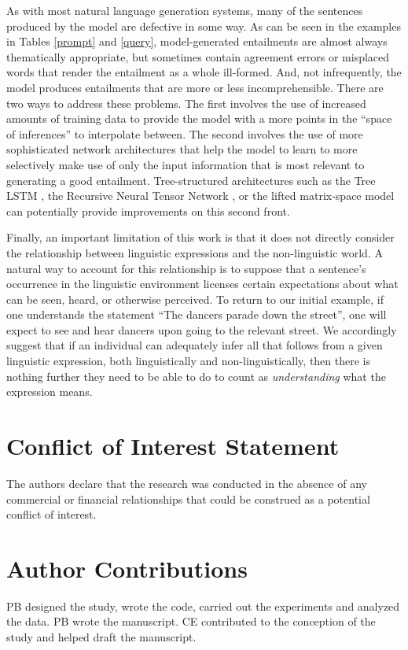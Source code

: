 \documentclass[utf8]{frontiersSCNS} %
\begin{document}
As with most natural language generation systems, many of the sentences produced by the model are defective in some way. As can be seen in the examples in Tables \ref{prompt} and \ref{query}, model-generated entailments are almost always thematically appropriate, but sometimes contain agreement errors or misplaced words that render the entailment as a whole ill-formed. And, not infrequently, the model produces entailments that are more or less incomprehensible. There are two ways to address these problems. The first involves the use of increased amounts of training data to provide the model with a more points in the ``space of inferences'' to interpolate between. The second involves the use of more sophisticated network architectures that help the model to learn to more selectively make use of only the input information that is most relevant to generating a good entailment. Tree-structured architectures such as the Tree LSTM \citep{Tai:2015,Zhu:2015}, the Recursive Neural Tensor Network \citep{Socher:2013}, or the lifted matrix-space model \citep{Bowman:2017} can potentially provide improvements on this second front. 

Finally, an important limitation of this work is that it does not directly consider the relationship between linguistic expressions and the non-linguistic world. A natural way to account for this relationship is to suppose that a sentence's occurrence in the linguistic environment licenses certain expectations about what can be seen, heard, or otherwise perceived. To return to our initial example, if one understands the statement ``The dancers parade down the street'', one will expect to see and hear dancers upon going to the relevant street. We accordingly suggest that if an individual can adequately infer all that follows from a given linguistic expression, both linguistically and non-linguistically, then there is nothing further they need to be able to do to count as \textit{understanding} what the expression means.


\section*{Conflict of Interest Statement}
The authors declare that the research was conducted in the absence of any commercial or financial relationships that could be construed as a potential conflict of interest.

\section*{Author Contributions}
PB designed the study, wrote the code, carried out the experiments and analyzed the data. PB wrote the manuscript. CE contributed to the conception of the study and helped draft the manuscript.
\end{document}

